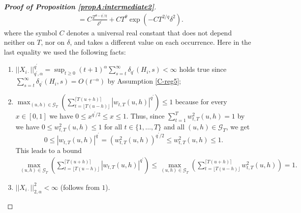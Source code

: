 \documentclass[a4paper,12pt]{article}
\makeatletter
\renewcommand{\eqref}[1]{\tagform@{\ref{#1}}}
\makeatother
\begin{document}
\begin{proof}[\textnormal{\textbf{Proof of Proposition \ref{propA:intermediate2}}}]
{\begin{align*}
&= C \frac{ T^{\theta - q^\prime/q}}{\delta^{q^\prime}} + C T^\theta \exp \left(-C T^{2/q} \delta^2\right).
\end{align*}}
where the symbol $C$ denotes a universal real constant that does not depend neither on $T$, nor on $\delta$, and takes a different value on each occurrence. Here in the last equality we used the following facts:
\begin{enumerate}
	\item $||X_{i\cdot}||^{q^\prime}_{q^\prime, \alpha} = \sup_{t\geq 0} (t+1)^{\alpha} \sum_{s=t}^{\infty} \delta_{q^\prime}(H_{i}, s)  < \infty$ holds true since $\sum_{s=t}^{\infty}\delta_{q^\prime}(H_{i}, s) = O(t^{-\alpha})$ by Assumption \ref{C-reg5};
	\item $\max_{(u, h) \in \mathcal{G}_T} \left( \sum_{t=\lfloor T(u-h) \rfloor}^{\lceil T(u+h) \rceil} |w_{t,T}(u,h)|^{q^\prime}\right) \leq 1$ because for every $x \in [0, 1]$ we have $ 0 \leq x^{q^\prime/2} \leq x \leq 1$. Thus, since $\sum_{t=1}^{T} w^2_{t,T}(u,h) = 1$ by \eqref{eq:sum_weights} we have \linebreak $0 \leq w^2_{t,T}(u,h) \leq 1$ for all $t\in \{1, \ldots, T\}$ and all $(u, h) \in \mathcal{G}_T$, we get
$$ 0 \leq |w_{t,T}(u,h)|^{q^\prime} =  (w^2_{t,T}(u,h))^{q^\prime/2} \leq w^2_{t,T}(u,h) \leq 1.$$
This leads to a bound  
\begin{align*}
\max_{(u, h) \in \mathcal{G}_T} \left( \sum_{t=\lfloor T(u-h) \rfloor}^{\lceil T(u+h) \rceil} |w_{t,T}(u,h)|^{q^\prime}\right) \leq
\max_{(u, h) \in \mathcal{G}_T} \left( \sum_{t=\lfloor T(u-h) \rfloor}^{\lceil T(u+h) \rceil} w_{t,T}^2(u,h)\right) =1.
\end{align*}
	\item $||X_{i\cdot}||^{2}_{2, \alpha} < \infty$ (follows from $1$).
\end{enumerate}



\end{proof}
\end{document}
